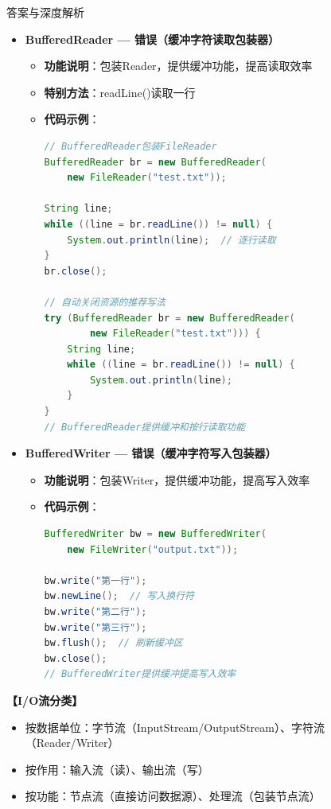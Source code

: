 \documentclass[12pt, a4paper]{ctexart}
\begin{document}
\begin{enumerate}[label=\textbf{\arabic*.}]
\begin{bluebox}{答案与深度解析}
\begin{itemize}[leftmargin=*, nosep, label={}]
			      \item[C] \textbf{BufferedReader — 错误（缓冲字符读取包装器）}
			            \begin{itemize}[label={}, leftmargin=*, nosep]
				            \item \textbf{功能说明}：包装Reader，提供缓冲功能，提高读取效率
				            \item \textbf{特别方法}：readLine()读取一行
				            \item \textbf{代码示例}：
				                  \begin{lstlisting}[language=Java]
// BufferedReader包装FileReader
BufferedReader br = new BufferedReader(
    new FileReader("test.txt"));

String line;
while ((line = br.readLine()) != null) {
    System.out.println(line);  // 逐行读取
}
br.close();

// 自动关闭资源的推荐写法
try (BufferedReader br = new BufferedReader(
        new FileReader("test.txt"))) {
    String line;
    while ((line = br.readLine()) != null) {
        System.out.println(line);
    }
}
// BufferedReader提供缓冲和按行读取功能
				      \end{lstlisting}
			            \end{itemize}

			      \item[D] \textbf{BufferedWriter — 错误（缓冲字符写入包装器）}
			            \begin{itemize}[label={}, leftmargin=*, nosep]
				            \item \textbf{功能说明}：包装Writer，提供缓冲功能，提高写入效率
				            \item \textbf{代码示例}：
				                  \begin{lstlisting}[language=Java]
BufferedWriter bw = new BufferedWriter(
    new FileWriter("output.txt"));

bw.write("第一行");
bw.newLine();  // 写入换行符
bw.write("第二行");
bw.write("第三行");
bw.flush();  // 刷新缓冲区
bw.close();
// BufferedWriter提供缓冲提高写入效率
				      \end{lstlisting}
			            \end{itemize}
		      \end{itemize}

		      \textbf{【I/O流分类】}
		      \begin{itemize}[label={}, nosep]
			      \item 按数据单位：字节流（InputStream/OutputStream）、字符流（Reader/Writer）
			      \item 按作用：输入流（读）、输出流（写）
			      \item 按功能：节点流（直接访问数据源）、处理流（包装节点流）
		      \end{itemize}


\end{bluebox}
\end{enumerate}
\end{document}
